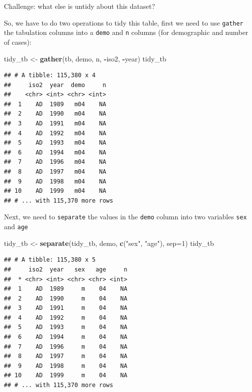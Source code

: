 \documentclass[]{book}
\newenvironment{Shaded}{\begin{snugshade}}{\end{snugshade}}
\newcommand{\KeywordTok}[1]{\textcolor[rgb]{0.13,0.29,0.53}{\textbf{#1}}}
\newcommand{\DataTypeTok}[1]{\textcolor[rgb]{0.13,0.29,0.53}{#1}}
\newcommand{\DecValTok}[1]{\textcolor[rgb]{0.00,0.00,0.81}{#1}}
\newcommand{\StringTok}[1]{\textcolor[rgb]{0.31,0.60,0.02}{#1}}
\newcommand{\OperatorTok}[1]{\textcolor[rgb]{0.81,0.36,0.00}{\textbf{#1}}}
\newcommand{\NormalTok}[1]{#1}
\theoremstyle{definition}
\theoremstyle{definition}
\theoremstyle{remark}
\begin{document}
Challenge: what else is untidy about this dataset?

So, we have to do two operations to tidy this table, first we need to
use \texttt{gather} the tabulation columns into a \texttt{demo} and
\texttt{n} columns (for demographic and number of cases):

\begin{Shaded}
\begin{Highlighting}[]
\NormalTok{tidy_tb <-}\StringTok{ }\KeywordTok{gather}\NormalTok{(tb, demo, n, }\OperatorTok{-}\NormalTok{iso2, }\OperatorTok{-}\NormalTok{year)}
\NormalTok{tidy_tb}
\end{Highlighting}
\end{Shaded}

\begin{verbatim}
## # A tibble: 115,380 x 4
##     iso2  year  demo     n
##    <chr> <int> <chr> <int>
##  1    AD  1989   m04    NA
##  2    AD  1990   m04    NA
##  3    AD  1991   m04    NA
##  4    AD  1992   m04    NA
##  5    AD  1993   m04    NA
##  6    AD  1994   m04    NA
##  7    AD  1996   m04    NA
##  8    AD  1997   m04    NA
##  9    AD  1998   m04    NA
## 10    AD  1999   m04    NA
## # ... with 115,370 more rows
\end{verbatim}

Next, we need to \texttt{separate} the values in the \texttt{demo}
column into two variables \texttt{sex} and \texttt{age}

\begin{Shaded}
\begin{Highlighting}[]
\NormalTok{tidy_tb <-}\StringTok{ }\KeywordTok{separate}\NormalTok{(tidy_tb, demo, }\KeywordTok{c}\NormalTok{(}\StringTok{"sex"}\NormalTok{, }\StringTok{"age"}\NormalTok{), }\DataTypeTok{sep=}\DecValTok{1}\NormalTok{)}
\NormalTok{tidy_tb}
\end{Highlighting}
\end{Shaded}

\begin{verbatim}
## # A tibble: 115,380 x 5
##     iso2  year   sex   age     n
##  * <chr> <int> <chr> <chr> <int>
##  1    AD  1989     m    04    NA
##  2    AD  1990     m    04    NA
##  3    AD  1991     m    04    NA
##  4    AD  1992     m    04    NA
##  5    AD  1993     m    04    NA
##  6    AD  1994     m    04    NA
##  7    AD  1996     m    04    NA
##  8    AD  1997     m    04    NA
##  9    AD  1998     m    04    NA
## 10    AD  1999     m    04    NA
## # ... with 115,370 more rows
\end{verbatim}
\end{document}
